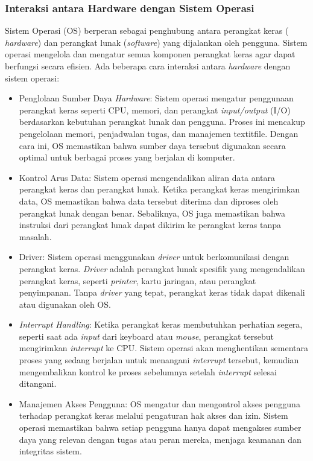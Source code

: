 \documentclass[12pt]{article}
\begin{document}
\subsubsection{Interaksi antara Hardware dengan Sistem Operasi}
Sistem Operasi (OS) berperan sebagai penghubung antara perangkat keras ( \textit{hardware}) dan perangkat lunak (\textit{software}) yang dijalankan oleh pengguna. Sistem operasi mengelola dan mengatur semua komponen perangkat keras agar dapat berfungsi secara efisien. Ada beberapa cara interaksi antara \textit{hardware} dengan sistem operasi:
\begin{itemize}
    \item Penglolaan Sumber Daya \textit{Hardware}: Sistem operasi mengatur penggunaan perangkat keras seperti CPU, memori, dan perangkat \textit{input/output} (I/O) berdasarkan kebutuhan perangkat lunak dan pengguna. Proses ini mencakup pengelolaan memori, penjadwalan tugas, dan manajemen textit{file}. Dengan cara ini, OS memastikan bahwa sumber daya tersebut digunakan secara optimal untuk berbagai proses yang berjalan di komputer.
    \item Kontrol Arus Data: Sistem operasi mengendalikan aliran data antara perangkat keras dan perangkat lunak. Ketika perangkat keras mengirimkan data, OS memastikan bahwa data tersebut diterima dan diproses oleh perangkat lunak dengan benar. Sebaliknya, OS juga memastikan bahwa instruksi dari perangkat lunak dapat dikirim ke perangkat keras tanpa masalah.
    \item Driver: Sistem operasi menggunakan \textit{driver} untuk berkomunikasi dengan perangkat keras. \textit{Driver} adalah perangkat lunak spesifik yang mengendalikan perangkat keras, seperti \textit{printer}, kartu jaringan, atau perangkat penyimpanan. Tanpa \textit{driver} yang tepat, perangkat keras tidak dapat dikenali atau digunakan oleh OS.
    \item \textit{Interrupt Handling}: Ketika perangkat keras membutuhkan perhatian segera, seperti saat ada \textit{input} dari keyboard atau \textit{mouse}, perangkat tersebut mengirimkan \textit{interrupt} ke CPU. Sistem operasi akan menghentikan sementara proses yang sedang berjalan untuk menangani \textit{interrupt} tersebut, kemudian mengembalikan kontrol ke proses sebelumnya setelah \textit{interrupt} selesai ditangani.
    \item Manajemen Akses Pengguna: OS mengatur dan mengontrol akses pengguna terhadap perangkat keras melalui pengaturan hak akses dan izin. Sistem operasi memastikan bahwa setiap pengguna hanya dapat mengakses sumber daya yang relevan dengan tugas atau peran mereka, menjaga keamanan dan integritas sistem.

\end{itemize}
\end{document}

